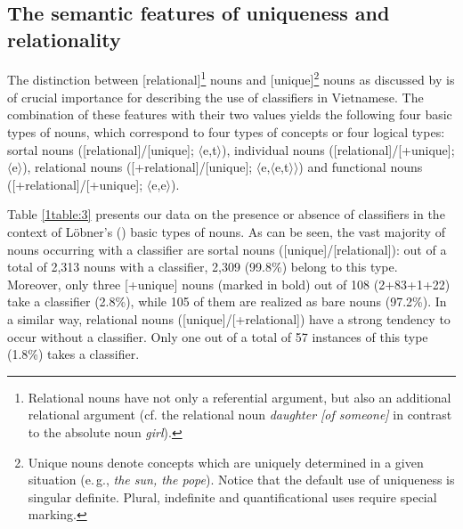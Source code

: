 \documentclass[output=paper]{langsci/langscibook}
\begin{document}
\subsection{The semantic features of uniqueness and relationality}\label{1sec:32}

{
The distinction between [\pm relational]\footnote{Relational nouns have not only a referential argument, but also an additional relational argument (cf. the relational noun {\emph{daughter [of someone]}} in contrast to the absolute noun {\emph{girl}}).} nouns and [\pm unique]\footnote{Unique nouns denote concepts which are uniquely determined in a given situation (e.\,g., {\emph{the sun, the pope}}). Notice that the default use of uniqueness is singular definite. Plural, indefinite and quantificational uses require special marking.} nouns as discussed by \cite{lobner:85,lobner:11} is of crucial importance for describing the use of classifiers in Vietnamese. The combination of these features with their two values yields the following four basic types of nouns, which correspond to four types of concepts or four logical types: sortal nouns ([\minus relational]/[\minus unique]; $\langle$e,t$\rangle$), individual nouns ([\minus relational]/[+unique]; $\langle$e$\rangle$), relational nouns ([+relational]/[\minus unique]; $\langle$e,$\langle$e,t$\rangle\rangle$) and functional nouns ([+relational]/[+unique]; $\langle$e,e$\rangle$).
}

{
Table \ref{1table:3} presents our data on the presence or absence of classifiers in the context of L\"obner's (\citeyear{lobner:85,lobner:11}) basic types of nouns. As can be seen, the vast majority of nouns occurring with a classifier are sortal nouns ([\minus unique]/[\minus relational]): out} of a total of 2,313 nouns with a classifier, 2,309 (99.8\%) belong to this type. Moreover, only three [+unique] nouns (marked in bold) out of 108 (2+83+1+22) take a classifier (2.8\%), while 105 of them are realized as bare nouns (97.2\%). In a similar way, relational nouns ([\minus unique]/[+relational]) have a strong tendency to occur without a classifier. Only one out of a total of 57 instances of this type (1.8\%) takes a classifier.
\end{document}
